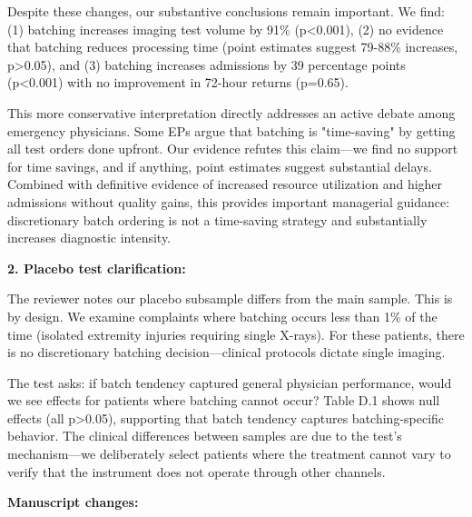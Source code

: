 \documentclass[11pt]{article}
\newcommand{\1}{\hbox{\rm 1\kern-.35em 1}}
\begin{document}
Despite these changes, our substantive conclusions remain important. We find: (1) batching increases imaging test volume by 91\% (p<0.001), (2) no evidence that batching reduces processing time (point estimates suggest 79-88\% increases, p>0.05), and (3) batching increases admissions by 39 percentage points (p<0.001) with no improvement in 72-hour returns (p=0.65).

This more conservative interpretation directly addresses an active debate among emergency physicians. Some EPs argue that batching is "time-saving" by getting all test orders done upfront. Our evidence refutes this claim—we find no support for time savings, and if anything, point estimates suggest substantial delays. Combined with definitive evidence of increased resource utilization and higher admissions without quality gains, this provides important managerial guidance: discretionary batch ordering is not a time-saving strategy and substantially increases diagnostic intensity.

\textbf{2. Placebo test clarification:}

The reviewer notes our placebo subsample differs from the main sample. This is by design. We examine complaints where batching occurs less than 1\% of the time (isolated extremity injuries requiring single X-rays). For these patients, there is no discretionary batching decision—clinical protocols dictate single imaging.

The test asks: if batch tendency captured general physician performance, would we see effects for patients where batching cannot occur? Table D.1 shows null effects (all p>0.05), supporting that batch tendency captures batching-specific behavior. The clinical differences between samples are due to the test's mechanism—we deliberately select patients where the treatment cannot vary to verify that the instrument does not operate through other channels.

\textbf{Manuscript changes:}
\end{document}
